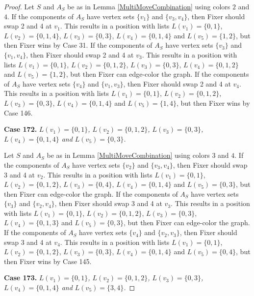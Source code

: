 \documentclass[12pt]{amsart}
\theoremstyle{plain}
\theoremstyle{definition}
\theoremstyle{remark}
\begin{document}
\begin{proof}
Let $S$ and $A_S$ be as in Lemma \ref{MultiMoveCombination} using colors $2$ and $4$. If the components of $A_S$ have vertex sets $\{v_1\}$ and $\{v_3, v_4\}$, then Fixer should swap 2 and 4 at $v_1$. This results in a position with lists $L(v_1) = \{0, 1\}$, $L(v_2) = \{0, 1, 4\}$, $L(v_3) = \{0, 3\}$, $L(v_4) = \{0, 1, 4\}$ and $L(v_5) = \{1, 2\}$, but then Fixer wins by Case 31.
If the components of $A_S$ have vertex sets $\{v_3\}$ and $\{v_1, v_4\}$, then Fixer should swap 2 and 4 at $v_3$. This results in a position with lists $L(v_1) = \{0, 1\}$, $L(v_2) = \{0, 1, 2\}$, $L(v_3) = \{0, 3\}$, $L(v_4) = \{0, 1, 2\}$ and $L(v_5) = \{1, 2\}$, but then Fixer can edge-color the graph.
If the components of $A_S$ have vertex sets $\{v_4\}$ and $\{v_1, v_3\}$, then Fixer should swap 2 and 4 at $v_4$. This results in a position with lists $L(v_1) = \{0, 1\}$, $L(v_2) = \{0, 1, 2\}$, $L(v_3) = \{0, 3\}$, $L(v_4) = \{0, 1, 4\}$ and $L(v_5) = \{1, 4\}$, but then Fixer wins by Case 146.

\noindent\textbf{Case 172.  }\textit{$L(v_1) = \{0, 1\}$, $L(v_2) = \{0, 1, 2\}$, $L(v_3) = \{0, 3\}$, $L(v_4) = \{0, 1, 4\}$ and $L(v_5) = \{0, 3\}$.}

Let $S$ and $A_S$ be as in Lemma \ref{MultiMoveCombination} using colors $3$ and $4$. If the components of $A_S$ have vertex sets $\{v_2\}$ and $\{v_3, v_4\}$, then Fixer should swap 3 and 4 at $v_2$. This results in a position with lists $L(v_1) = \{0, 1\}$, $L(v_2) = \{0, 1, 2\}$, $L(v_3) = \{0, 4\}$, $L(v_4) = \{0, 1, 4\}$ and $L(v_5) = \{0, 3\}$, but then Fixer can edge-color the graph.
If the components of $A_S$ have vertex sets $\{v_3\}$ and $\{v_2, v_4\}$, then Fixer should swap 3 and 4 at $v_3$. This results in a position with lists $L(v_1) = \{0, 1\}$, $L(v_2) = \{0, 1, 2\}$, $L(v_3) = \{0, 3\}$, $L(v_4) = \{0, 1, 3\}$ and $L(v_5) = \{0, 3\}$, but then Fixer can edge-color the graph.
If the components of $A_S$ have vertex sets $\{v_4\}$ and $\{v_2, v_3\}$, then Fixer should swap 3 and 4 at $v_4$. This results in a position with lists $L(v_1) = \{0, 1\}$, $L(v_2) = \{0, 1, 2\}$, $L(v_3) = \{0, 3\}$, $L(v_4) = \{0, 1, 4\}$ and $L(v_5) = \{0, 4\}$, but then Fixer wins by Case 145.

\noindent\textbf{Case 173.  }\textit{$L(v_1) = \{0, 1\}$, $L(v_2) = \{0, 1, 2\}$, $L(v_3) = \{0, 3\}$, $L(v_4) = \{0, 1, 4\}$ and $L(v_5) = \{3, 4\}$.}


\end{proof}
\end{document}
